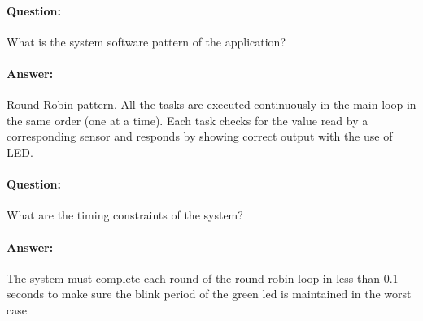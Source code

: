 \documentclass[10pt]{article}
\begin{document}
\paragraph{Question:}

What is the system software pattern of the application?

\paragraph{Answer:}

Round Robin pattern. All the tasks are executed continuously in the main loop in
the same order (one at a time). Each task checks for the value read by a
corresponding sensor and responds by showing correct output with the use of LED.

\paragraph{Question:}

What are the timing constraints of the system?

\paragraph{Answer:}

The system must complete each round of the round robin loop in less than 0.1
seconds to make sure the blink period of the green led is maintained in the
worst case
\end{document}
